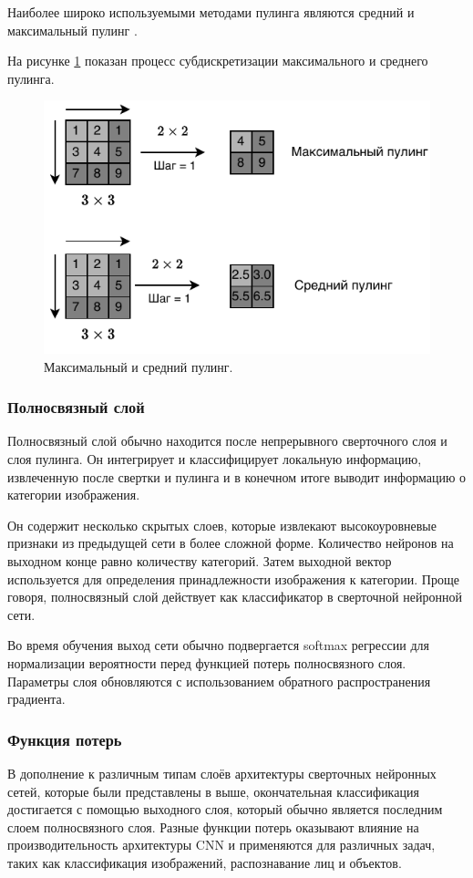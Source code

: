 Наиболее широко используемыми методами пулинга являются средний и максимальный пулинг \cite{pooling-layer-4}.

На рисунке \ref{fig:pooling-layer} показан процесс субдискретизации максимального и среднего пулинга.
\begin{figure}[H]
	\centering
	\includegraphics[width=\textwidth]{img/pooling.pdf}
	\caption{Максимальный и средний пулинг.}
	\label{fig:pooling-layer}
\end{figure}


\subsubsection{Полносвязный слой}
Полносвязный  слой обычно находится после непрерывного сверточного слоя и слоя пулинга. Он интегрирует и классифицирует локальную информацию, извлеченную после свертки и пулинга и в конечном итоге выводит информацию о категории изображения. 

Он содержит несколько скрытых слоев, которые извлекают высокоуровневые признаки из предыдущей сети в более сложной форме. Количество нейронов на выходном конце равно количеству категорий. Затем выходной вектор используется для определения принадлежности изображения к категории. Проще говоря, полносвязный слой действует как классификатор в сверточной нейронной сети.

Во время обучения  выход сети обычно подвергается softmax регрессии\cite{pooling-layer-1} для нормализации вероятности перед функцией потерь полносвязного слоя. Параметры слоя обновляются с использованием обратного распространения градиента.

\subsubsection{Функция потерь}
В дополнение к различным типам слоёв архитектуры сверточных нейронных сетей, которые были представлены в выше, окончательная классификация достигается с помощью выходного слоя, который обычно является последним слоем полносвязного слоя. Разные функции потерь оказывают влияние на производительность архитектуры CNN и применяются для различных задач, таких как классификация изображений, распознавание лиц и объектов.


